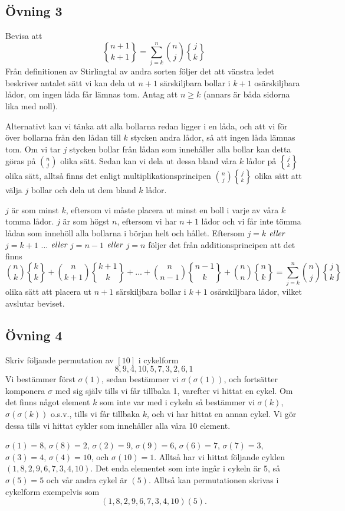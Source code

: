 \documentclass{article}
\begin{document}
\subsection*{Övning 3}
Bevisa att $$
{n + 1 \brace k + 1} = \sum _{j = k} ^{n} {n \choose j}{j \brace k}
$$
Från definitionen av Stirlingtal av andra sorten följer det att vänstra ledet beskriver antalet sätt vi kan dela ut $n + 1$ särskiljbara bollar i $k + 1$ osärskiljbara lådor, om ingen låda får lämnas tom. Antag att $n \geq k$ (annars är båda sidorna lika med noll). 

Alternativt kan vi tänka att alla bollarna redan ligger i en låda, och att vi för över bollarna från den lådan till $k$ stycken andra lådor, så att ingen låda lämnas tom. Om vi tar $j$ stycken bollar från lådan som innehåller alla bollar kan detta göras på $n \choose j$ olika sätt. Sedan kan vi dela ut dessa bland våra $k$ lådor på $j \brace k$ olika sätt, alltså finns det enligt multiplikationsprincipen $ {n \choose j}{j \brace k}$ olika sätt att välja $j$ bollar och dela ut dem bland $k$ lådor.

$j$ är som minst $k$, eftersom vi måste placera ut minst en boll i varje av våra $k$ tomma lådor. $j$ är som högst $n$, eftersom vi har $n + 1$ lådor och vi får inte tömma lådan som innehöll alla bollarna i början helt och hållet. Eftersom $j=k$ $\emph{eller}$ $j=k + 1$ ... $\emph{eller}$ $j= n - 1$ $\emph{eller}$ $j= n$ följer det från additionsprincipen att det finns $$
{n \choose k}{k \brace k} + {n \choose k + 1}{k + 1 \brace k} + ... + {n \choose n - 1}{n - 1\brace k} + {n \choose n}{n \brace k} =  \sum _{j = k} ^{n} {n \choose j}{j \brace k}
$$
olika sätt att placera ut $n + 1$ särskiljbara bollar i $k + 1$ osärskiljbara lådor, vilket avslutar beviset. 

\subsection*{Övning 4}
Skriv följande permutation av $[10]$ i cykelform $$
8, 9, 4, 10, 5, 7, 3, 2, 6, 1
$$
Vi bestämmer först $\sigma(1)$, sedan bestämmer vi $\sigma(\sigma(1))$, och fortsätter komponera $\sigma$ med sig själv tills vi får tillbaka 1, varefter vi hittat en cykel. Om det finns något element $k$ som inte var med i cykeln så bestämmer vi $\sigma(k)$, $\sigma(\sigma(k))$ o.s.v., tills vi får tillbaka $k$, och vi har hittat en annan cykel. Vi gör dessa tills vi hittat cykler som innehåller alla våra 10 element. 

$\sigma(1)=8$, $\sigma(8)=2$, $\sigma(2)=9$, $\sigma(9)=6$, $\sigma(6)=7$, $\sigma(7)=3$, $\sigma(3)=4$, $\sigma(4)=10$, och $\sigma(10)=1$. Alltså har vi hittat följande cyklen $(1, 8, 2, 9, 6, 7, 3, 4, 10)$. Det enda elementet som inte ingår i cykeln är $5$, så $\sigma(5)=5$ och vår andra cykel är $(5)$. Alltså kan permutationen skrivas i cykelform exempelvis som $$
(1, 8, 2, 9, 6, 7, 3, 4, 10)(5).
$$
\end{document}
